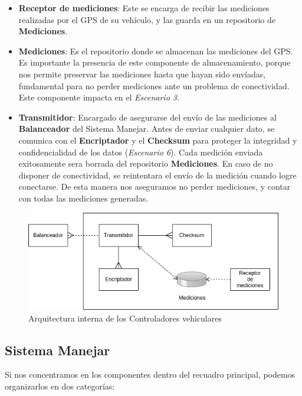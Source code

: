\begin{itemize}
\item \textbf{Receptor de mediciones}: Este se encarga de recibir las mediciones realizadas por el GPS de su vehículo,
 y las guarda en un repositorio de \textbf{Mediciones}.
 
\item \textbf{Mediciones}: Es el repositorio donde se almacenan las mediciones del GPS.
 Es importante la presencia de este componente de almacenamiento, porque nos permite preservar
las mediciones hasta que hayan sido envíadas, fundamental para no perder mediciones ante un
problema de conectividad. Este componente impacta en el \textit{Escenario 3}.

\item \textbf{Transmitidor}: Encargado de asegurarse del envío de las mediciones al \textbf{Balanceador}
del Sistema Manejar. Antes de enviar cualquier dato, se comunica con el \textbf{Encriptador} y el
\textbf{Checksum} para proteger la integridad y confidencialidad de los datos (\textit{Escenario 
6}).
Cada medición enviada exitosamente sera borrada del repositorio \textbf{Mediciones}.
En caso de no disponer de conectividad, se reintentara el envío de la medición cuando logre conectarse.
De esta manera nos aseguramos no perder mediciones, y contar con todas las mediciones generadas.
\end{itemize}

\begin{figure}
\centerline{\includegraphics[width=1\textwidth]{./imagenes/arquitectura_tp2/controlador_vehicular.png}}
\caption{Arquitectura interna de los Controladores vehiculares}
\end{figure}


\subsection{Sistema Manejar}

Si nos concentramos en los componentes dentro del recuadro principal, podemos 
organizarlos en dos categorías:

